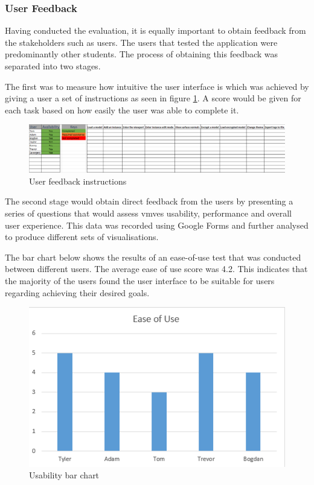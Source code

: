 \documentclass[11pt]{article}
\begin{document}

\subsubsection{User Feedback}
Having conducted the evaluation, it is equally important to obtain feedback from
the stakeholders such as users. The users that tested the application were
predominantly other students. The process of obtaining this feedback was
separated into two stages.

The first was to measure how intuitive the user interface is which was achieved
by giving a user a set of instructions as seen in figure \ref{fig:instructions}.
A score would be given for each task based on how easily the user was able to
complete it.

\begin{figure}[H]
  \centering
  \includegraphics[width=\textwidth]{images/user_instructions.png}
  \caption{User feedback instructions }
  \label{fig:instructions}
\end{figure}

The second stage would obtain direct feedback from the users by presenting a
series of questions that would assess \glspl*{vmve} usability, performance and
overall user experience. This data was recorded using Google Forms and further
analysed to produce different sets of visualisations.

The bar chart below shows the results of an ease-of-use test that was conducted
between different users. The average ease of use score was 4.2. This indicates
that the majority of the users found the user interface to be suitable for users
regarding achieving their desired goals.

\begin{figure}[H]
  \centering
  \includegraphics[width=\textwidth]{images/bar_chart_usability.png}
  \caption{Usability bar chart}
  \label{fig:bar_chart_usability}
\end{figure}
\end{document}
